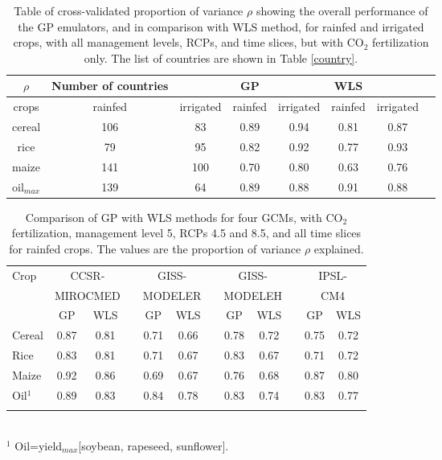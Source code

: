 \begin{table*}[!ht] 
\caption{Table of cross-validated proportion of variance $\rho$ showing the overall performance of the GP emulators, and in comparison with WLS method, for rainfed and irrigated crops, with all management levels, RCPs, and time slices, but with CO$_2$ fertilization only. The list of countries are shown in Table \ref{country}.}
\label{GPtab2}
\begin{tabular}{|c|cc|cc|ccc|}
\hline
$\rho$ &Number of countries& & GP&&WLS&& \\
\hline
crops&rainfed&irrigated& rainfed&irrigated&rainfed&irrigated& \\
\hline
cereal&106&83 & 0.89&0.94&0.81&0.87&\\ 
\hline
rice& 79 & 95&0.82&0.92&0.77&0.93&\\ 
\hline
maize &141 &100 &0.70&0.80&0.63&0.76&\\ 
\hline
oil$_{max}$ &139 &64 &0.89&0.88&0.91&0.88&\\ 
\hline
\end{tabular}
\end{table*}


\begin{table*}%
\small{
\caption{Comparison of GP with WLS methods for four GCMs, with CO$_2$ fertilization, management level 5, RCPs 4.5 and 8.5, and all time slices for rainfed crops. The values are the proportion of variance $\rho$ explained.}
\label{GPtab3}
\begin{tabular}{lccccccccccc}
\hline
Crop&\multicolumn{2}{c}{CCSR-}&&\multicolumn{2}{c}{GISS-}&
&\multicolumn{2}{c}{GISS-}&&\multicolumn{2}{c}{IPSL-}\\
&\multicolumn{2}{c}{MIROCMED}&&\multicolumn{2}{c}{MODELER}&
&\multicolumn{2}{c}{MODELEH}&&\multicolumn{2}{c}{CM4} \\
\cline{2-3} \cline{5-6} \cline{8-9} \cline{11-12}
&GP& WLS&& GP&WLS&&GP&WLS&&GP&WLS \\
\hline
\vspace{.2in}
Cereal&0.87& 0.81&& 0.71&0.66&&0.78&0.72&&0.75&0.72\\
\vspace{.2in}
Rice& 0.83 & 0.81&&0.71&0.67&&0.83&0.67&&0.71&0.72\\
\vspace{.2in}
Maize & 0.92& 0.86&&0.69&0.67&&0.76&0.68&&0.87&0.80\\
\vspace{.2in}
Oil$^1$ &0.89 & 0.83&&0.84&0.78&&0.83&0.74&&0.83&0.77\\
\hline \vspace{-.1in}
\end{tabular}\\
{\footnotesize $^1$ Oil=yield$_{max}$[soybean, rapeseed, sunflower].\\} }
\end{table*}

